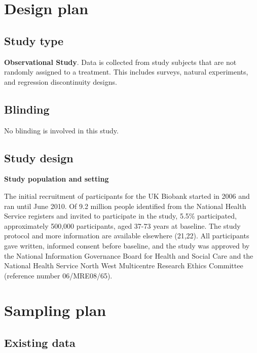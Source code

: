 \documentclass[
  11pt,
  a4paper,
  DIV=11,
  numbers=noendperiod,
  twocolumn]{scrartcl}
\begin{document}
\hypertarget{design-plan}{%
\section{Design plan}\label{design-plan}}

\hypertarget{study-type}{%
\subsection{Study type}\label{study-type}}

\textbf{Observational Study}. Data is collected from study subjects that
are not randomly assigned to a treatment. This includes surveys, natural
experiments, and regression discontinuity designs.

\hypertarget{blinding}{%
\subsection{Blinding}\label{blinding}}

No blinding is involved in this study.

\hypertarget{study-design}{%
\subsection{Study design}\label{study-design}}

\textbf{Study population and setting}

The initial recruitment of participants for the UK Biobank started in
2006 and ran until June 2010. Of 9.2 million people identified from the
National Health Service registers and invited to participate in the
study, 5.5\% participated, approximately 500,000 participants, aged
37-73 years at baseline. The study protocol and more information are
available elsewhere (21,22). All participants gave written, informed
consent before baseline, and the study was approved by the National
Information Governance Board for Health and Social Care and the National
Health Service North West Multicentre Research Ethics Committee
(reference number 06/MRE08/65).

\hypertarget{sampling-plan}{%
\section{Sampling plan}\label{sampling-plan}}

\hypertarget{existing-data}{%
\subsection{Existing data}\label{existing-data}}
\end{document}
